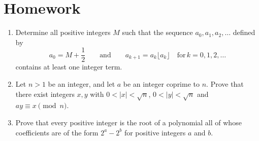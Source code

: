 \documentclass{article}
\begin{document}
\section{Homework}
\begin{enumerate}
	\item Determine all positive integers $M$ such that the sequence $a_0, a_1,
		      a_2, \ldots$ defined by \[ a_0 = M + \frac{1}{2} \qquad \textrm{and}
		      \qquad a_{k+1} = a_k\lfloor a_k \rfloor \quad \textrm{for} \, k = 0, 1,
		      2, \ldots \]contains at least one integer term.
	\item Let $n>1$ be an integer, and let $a$ be an integer coprime to $n$. Prove
	      that there exist integers $x,y$ with $0<|x|<\sqrt n$, $0<|y|<\sqrt n$ and
	      $ay\equiv x\pmod n$.
	\item Prove that every positive integer is the root of a polynomial all of whose
	      coefficients are of the form $2^a-2^b$ for positive integers $a$ and $b$.
\end{enumerate}
\end{document}
